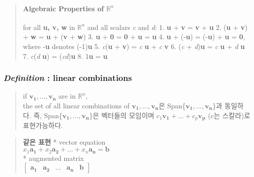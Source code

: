 \documentclass[11pt]{article}
\begin{document}
\begin{quote}
\mbox{}%
\hypertarget{algebraic-properties-of-mathbbrn}{%
\paragraph{\texorpdfstring{Algebraic Properties of
\(\mathbb{R}^n\)}{Algebraic Properties of \textbackslash{}mathbb\{R\}\^{}n}}\label{algebraic-properties-of-mathbbrn}}

for all \textbf{u, v, w} in \(\mathbb{R}^n\) and all scalars \emph{c}
and \emph{d}: 1. \textbf{u} + \textbf{v} = \textbf{v} + \textbf{u} 2.
(\textbf{u} + \textbf{v}) + \textbf{w} = \textbf{u} + (\textbf{v} +
\textbf{w}) 3. \textbf{u} + \textbf{0} = \textbf{0} + \textbf{u} =
\textbf{u} 4. \textbf{u} + (-\textbf{u}) = (-\textbf{u}) + \textbf{u} =
\textbf{0}, where -\textbf{u} denotes (-1)\textbf{u} 5.
\emph{c}(\textbf{u} + \textbf{v}) = \emph{c} \textbf{u} + \emph{c}
\textbf{v} 6. (\emph{c} + \emph{d})\textbf{u} = \emph{c} \textbf{u} +
\emph{d} \textbf{u} 7. \emph{c}(\emph{d} \textbf{u}) =
(\emph{cd})\textbf{u} 8. 1\textbf{u} = \textbf{u}
\end{quote}

    \hypertarget{definition-linear-combinations}{%
\subsubsection{\texorpdfstring{\emph{Definition} : linear
combinations}{Definition : linear combinations}}\label{definition-linear-combinations}}

\begin{quote}
if \(\mathbf{v_{1}}, \dots, \mathbf{v_{n}}\) are in \(\mathbb{R}^n\),\\
the set of all linear combinations of
\(\mathbf{v_{1}}, \dots, \mathbf{v_{n}}\)은
Span\{\(\mathbf{v_{1}}, \dots, \mathbf{v_{n}}\)\}과 동일하다. 즉,
Span\{\(\mathbf{v_{1}}, \dots, \mathbf{v_{n}}\)\}은 벡터들의 모임이며
\(c_{1}\mathbf{v_{1}} + \dots + c_{p}\mathbf{v_{p}}\) (c는 스칼라)로
표현가능하다.
\end{quote}

\begin{quote}
\textbf{같은 표현} * vector equation\\
\(x_{1}\mathbf{a_{1}} + x_{2}\mathbf{a_{2}} + \dots + x_{n}\mathbf{a_{n}} = \mathbf{b}\)\\
* augmented matrix\\
\(\begin{bmatrix} \mathbf{a_{1}} & \mathbf{a_{2}} & \dots & \mathbf{a_{n}} & \mathbf{b} \end{bmatrix}\)
\end{quote}
\end{document}
